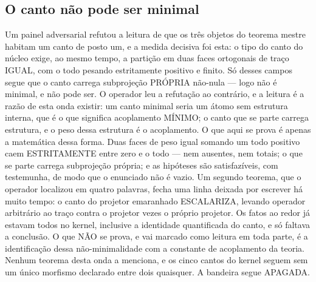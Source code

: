 \documentclass[11pt]{article}
\theoremstyle{definition}\newtheorem{deriv}{Derivação}
\begin{document}
\subsection*{O canto n\~ao pode ser minimal}Um painel adversarial refutou a leitura de que os tr\^es objetos do teorema mestre habitam um canto de posto um, e a medida decisiva foi esta: o tipo do canto do n\'ucleo exige, ao mesmo tempo, a parti\c{c}\~ao em duas faces ortogonais de tra\c{c}o IGUAL, com o todo pesando estritamente positivo e finito. S\'o desses campos segue que o canto carrega subproje\c{c}\~ao PR\'OPRIA n\~ao-nula --- logo n\~ao \'e minimal, e n\~ao pode ser. O operador leu a refuta\c{c}\~ao ao contr\'ario, e a leitura \'e a raz\~ao de esta onda existir: um canto minimal seria um \'atomo sem estrutura interna, que \'e o que significa acoplamento M\'INIMO; o canto que se parte carrega estrutura, e o peso dessa estrutura \'e o acoplamento. O que aqui se prova \'e apenas a matem\'atica dessa forma. Duas faces de peso igual somando um todo positivo caem ESTRITAMENTE entre zero e o todo --- nem ausentes, nem totais; o que se parte carrega subproje\c{c}\~ao pr\'opria; e as hip\'oteses s\~ao satisfaz\'iveis, com testemunha, de modo que o enunciado n\~ao \'e vazio. Um segundo teorema, que o operador localizou em quatro palavras, fecha uma linha deixada por escrever h\'a muito tempo: o canto do projetor emaranhado ESCALARIZA, levando operador arbitr\'ario ao tra\c{c}o contra o projetor vezes o pr\'oprio projetor. Os fatos ao redor j\'a estavam todos no kernel, inclusive a identidade quantificada do canto, e s\'o faltava a conclus\~ao. O que N\~AO se prova, e vai marcado como leitura em toda parte, \'e a identifica\c{c}\~ao dessa n\~ao-minimalidade com a constante de acoplamento da teoria. Nenhum teorema desta onda a menciona, e os cinco cantos do kernel seguem sem um \'unico morfismo declarado entre dois quaisquer. A bandeira segue APAGADA.
\end{document}
